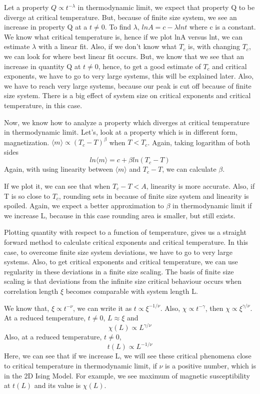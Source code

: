 \documentclass[12pt,fleqn]{report}
\begin{document}
Let a property $Q \propto t^{-\lambda}$ in thermodynamic limit, we 
expect that property Q to be diverge at critical temperature. But, because 
of finite size system, we see an increase in property Q at a $t \neq 0$.
To find $\lambda$, $lnA = c - \lambda lnt$ 
where c is a constant. We know what critical temperature is, hence if we 
plot lnA versus lnt, we can estimate $\lambda$ with a linear fit. Also, if we 
don't know what $T_c$ is, with changing $T_c$, we can look for where best 
linear fit occurs. But, we know that we see that an increase in quantity Q at 
$t \neq 0 $, hence, to get a good estimate of $T_c$ and critical exponents, 
we have to go to very 
large systems, this will be explained later. Also, we have to reach very large 
systems, because our 
peak is cut off because of finite size system. There is a big effect of system 
size on critical exponents and critical temperature, in this case. 

Now, we know how to analyze a property which diverges at critical 
temperature in thermodynamic limit. Let's, look at a property which is in 
different form, magnetization. $\langle m \rangle  \propto (T_c - 
T)^\beta$ when $T < T_c$. Again, taking logarithm of both sides 
$$ln \langle m \rangle = c + \beta ln(T_c-T)$$ Again, with using linearity 
between $\langle m \rangle$ and $T_c - T$, we can calculate $\beta$.

If we plot it, we can see that when $T_c - T < A$, linearity is more 
accurate. Also, if T is so close to $T_c$, rounding sets in because of finite 
size system and 
linearity is spoiled.  Again, we expect a better approximation to $\beta$ in 
thermodynamic limit if we increase L, because in this case rounding area is 
smaller, but still exists.  



Plotting quantity with respect to a function of temperature, gives 
us a straight forward method to calculate critical exponents and critical 
temperature. In this case, to overcome finite size system deviations, we 
have to go to very large systems. Also, to get critical exponents and critical 
temperature, we can use regularity in these deviations in a finite size 
scaling. The basis of finite size scaling is that deviations from the infinite 
size critical behaviour occurs when correlation length $\xi $ becomes 
comparable with system length L. \cite{sandvik}

We know that, $\xi \propto t^{-\nu}$, we can write it as $t \propto 
\xi^{-1/\nu}$. Also, $\chi \propto t^{-\gamma}$, then $\chi \propto 
\xi^{\gamma / \nu}$. At a reduced temperature, $t \neq 0$, $L \approx 
\xi$ and 
$$\chi (L) \propto L^{\gamma / \nu}$$
Also, at a reduced temperature, $t \neq 0$, $$t(L) \propto L^{-1/\nu}$$ 
Here, we can see that if we increase L, we will see these critical phenomena 
close to critical temperature in thermodynamic limit, if $\nu$ is a positive 
number, which is in the 2D Ising Model. For example, 
we see maximum of magnetic susceptibility at $t(L)$ and its value is $\chi 
(L)$.
\end{document}
